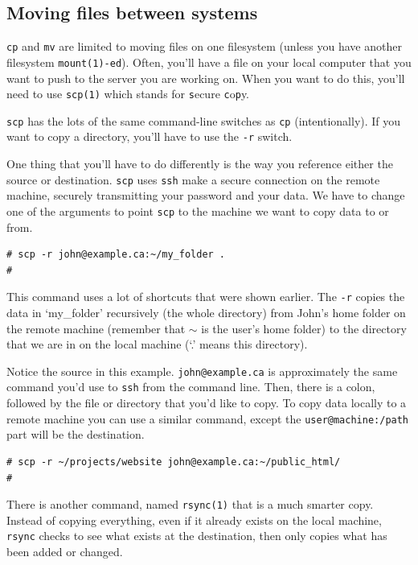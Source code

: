 \subsection{Moving files between systems}
{\tt cp} and {\tt mv} are limited to moving files on one
filesystem (unless you have another filesystem {\tt mount(1)-ed}).
Often, you'll have a file on your local computer that you want to 
push to the server you are working on.  When you want to do this,
you'll need to use {\tt scp(1)} which stands for {\tt s}ecure {\tt c}o{\tt p}y.

{\tt scp} has the lots of the same command-line switches as {\tt cp} (intentionally). 
If you want to copy a directory, you'll have to use the {\tt -r} switch.

One thing that you'll have to do differently is the way you reference
either the source or destination. {\tt scp} uses {\tt ssh} 
make a secure connection on the remote machine, securely transmitting
your password and your data. We have to change one of the arguments to
point {\tt scp} to the machine we want to copy data to or from.

{\tt \begin{verbatim}
# scp -r john@example.ca:~/my_folder .
#
\end{verbatim}
}

This command uses a lot of shortcuts that were shown earlier.  The {\tt -r} copies
the data in `my\_folder' recursively (the whole directory) from John's home folder on 
the remote machine (remember
that $\sim$ is the user's home folder) to the directory that we are in on the local machine (`.'
means this directory).

Notice the source in this example.  {\tt john@example.ca} is approximately the same
command you'd use to {\tt ssh} from the command line. Then, there is a colon, followed by
the file or directory that you'd like to copy. To copy data locally to a
remote machine you can use a similar command, except the {\tt user@machine:/path} 
part will be the destination.

{\tt \begin{verbatim}
# scp -r ~/projects/website john@example.ca:~/public_html/
#
\end{verbatim}
}


There is another command, named {\tt rsync(1)} that is a much smarter copy.
Instead of copying everything, even if it already exists on the local machine, 
{\tt rsync} checks to see what exists at the destination, then only copies 
what has been added or changed.

